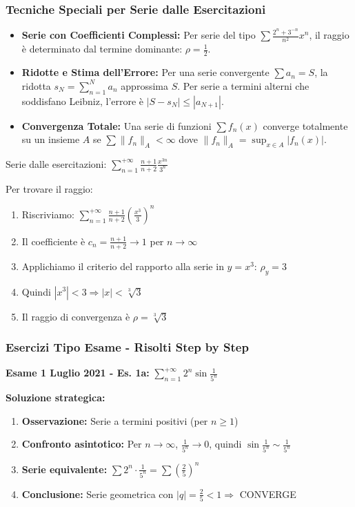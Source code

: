 \subsubsection{Tecniche Speciali per Serie dalle Esercitazioni}
\begin{itemize}
    \item \textbf{Serie con Coefficienti Complessi:} Per serie del tipo $\sum \frac{2^n + 3^{-n}}{n^2} x^n$, il raggio è determinato dal termine dominante: $\rho = \frac{1}{2}$.
    \item \textbf{Ridotte e Stima dell'Errore:} Per una serie convergente $\sum a_n = S$, la ridotta $s_N = \sum_{n=1}^N a_n$ approssima $S$. Per serie a termini alterni che soddisfano Leibniz, l'errore è $|S - s_N| \leq |a_{N+1}|$.
    \item \textbf{Convergenza Totale:} Una serie di funzioni $\sum f_n(x)$ converge totalmente su un insieme $A$ se $\sum \|f_n\|_A < \infty$ dove $\|f_n\|_A = \sup_{x \in A} |f_n(x)|$.
\end{itemize}

\begin{esempio}
Serie dalle esercitazioni: $\sum_{n=1}^{+\infty} \frac{n+1}{n+2} \frac{x^{3n}}{3^n}$

Per trovare il raggio:
\begin{enumerate}
    \item Riscriviamo: $\sum_{n=1}^{+\infty} \frac{n+1}{n+2} \left(\frac{x^3}{3}\right)^n$
    \item Il coefficiente è $c_n = \frac{n+1}{n+2} \to 1$ per $n \to \infty$
    \item Applichiamo il criterio del rapporto alla serie in $y = x^3$: $\rho_y = 3$
    \item Quindi $|x^3| < 3 \Rightarrow |x| < \sqrt[3]{3}$
    \item Il raggio di convergenza è $\rho = \sqrt[3]{3}$
\end{enumerate}
\end{esempio}

\subsubsection{Esercizi Tipo Esame - Risolti Step by Step}

\begin{esempio}
\textbf{Esame 1 Luglio 2021 - Es. 1a:} $\displaystyle\sum_{n=1}^{+\infty} 2^{n} \sin\frac{1}{5^{n}}$

\textbf{Soluzione strategica:}
\begin{enumerate}
    \item \textbf{Osservazione:} Serie a termini positivi (per $n \ge 1$)
    \item \textbf{Confronto asintotico:} Per $n \to \infty$, $\frac{1}{5^n} \to 0$, quindi $\sin\frac{1}{5^n} \sim \frac{1}{5^n}$
    \item \textbf{Serie equivalente:} $\sum 2^n \cdot \frac{1}{5^n} = \sum \left(\frac{2}{5}\right)^n$
    \item \textbf{Conclusione:} Serie geometrica con $|q| = \frac{2}{5} < 1 \Rightarrow$ CONVERGE
\end{enumerate}
\end{esempio}

